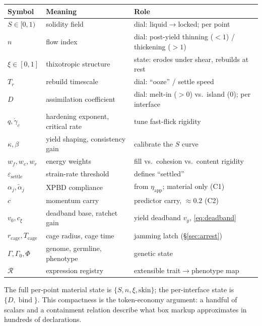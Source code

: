 \documentclass[11pt]{article}
\DeclareMathOperator{\bind}{bind}
\newcommand{\R}{\mathcal{R}}
\newcommand{\Gnome}{\Gamma}
\newcommand{\Phe}{\Phi}
\newcommand{\rate}{\dot{\gamma}}
\begin{document}
\begin{center}\small
\begin{tabular}{@{}lll@{}}
\toprule
Symbol & Meaning & Role \\
\midrule
$S\in[0,1)$ & solidity field & dial: liquid$\to$locked; per point \\
$n$ & flow index & dial: post-yield thinning ($<1$) / thickening ($>1$) \\
$\xi\in[0,1]$ & thixotropic structure & state: erodes under shear, rebuilds at rest \\
$T_r$ & rebuild timescale & dial: ``ooze'' / settle speed \\
$D$ & assimilation coefficient & dial: melt-in ($>0$) vs.\ island ($0$); per interface \\
$q,\rate_c$ & hardening exponent, critical rate & tune fast-flick rigidity \\
$\kappa,\beta$ & yield shaping, consistency gain & calibrate the $S$ curve \\
$w_f,w_c,w_r$ & energy weights & fill vs.\ cohesion vs.\ content rigidity \\
$\varepsilon_{\text{settle}}$ & strain-rate threshold & defines ``settled'' \\
$\alpha_j,\tilde{\alpha}_j$ & XPBD compliance & from $\eta_{\text{app}}$; material only (C1) \\
$c$ & momentum carry & predictor carry, $\approx0.2$ (C2) \\
$v_0, c_\xi$ & deadband base, ratchet gain & yield deadband $v_y$, \eqref{eq:deadband} \\
$r_{\text{cage}}, T_{\text{cage}}$ & cage radius, cage time & jamming latch (\S\ref{sec:arrest}) \\
$\Gnome,\Gnome_0,\Phe$ & genome, germline, phenotype & genetic state \\
$\R$ & expression registry & extensible trait$\to$phenotype map \\
\bottomrule
\end{tabular}
\end{center}

\noindent The full per-point material state is $\{S,n,\xi,\text{skin}\}$; the per-interface state
is $\{D,\bind\}$. This compactness is the token-economy argument: a handful of scalars and a
containment relation describe what box markup approximates in hundreds of declarations.
\end{document}

